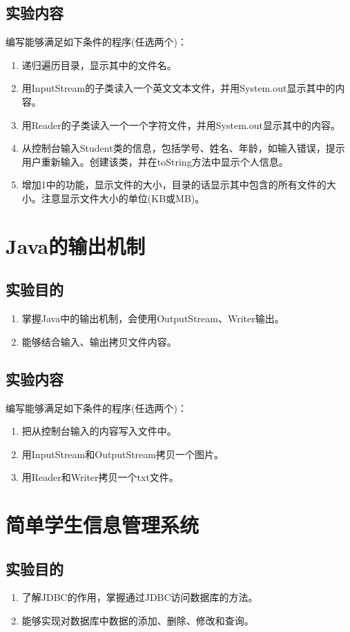 ﻿\documentclass[cs5size,b5paper,nofonts,twoside]{ctexart}
\begin{document}
\subsection{实验内容}
编写能够满足如下条件的程序(任选两个)：
\begin{enumerate}
\item 递归遍历目录，显示其中的文件名。
\item 用InputStream的子类读入一个英文文本文件，并用System.out显示其中的内容。
\item 用Reader的子类读入一个一个字符文件，并用System.out显示其中的内容。
\item 从控制台输入Student类的信息，包括学号、姓名、年龄，如输入错误，提示用户重新输入。创建该类，并在toString方法中显示个人信息。
\item 增加1中的功能，显示文件的大小，目录的话显示其中包含的所有文件的大小。注意显示文件大小的单位(KB或MB)。
\end{enumerate}

\section{Java的输出机制}
\hfill{}
\subsection{实验目的}
\begin{enumerate}
\item 掌握Java中的输出机制，会使用OutputStream、Writer输出。
\item 能够结合输入、输出拷贝文件内容。
\end{enumerate}
\subsection{实验内容}
编写能够满足如下条件的程序(任选两个)：
\begin{enumerate}
\item 把从控制台输入的内容写入文件中。
\item 用InputStream和OutputStream拷贝一个图片。
\item 用Reader和Writer拷贝一个txt文件。
\end{enumerate}

\clearpage
\section{简单学生信息管理系统}
\subsection{实验目的}
\begin{enumerate}
\item 了解JDBC的作用，掌握通过JDBC访问数据库的方法。
\item 能够实现对数据库中数据的添加、删除、修改和查询。
\end{enumerate}
\end{document}
